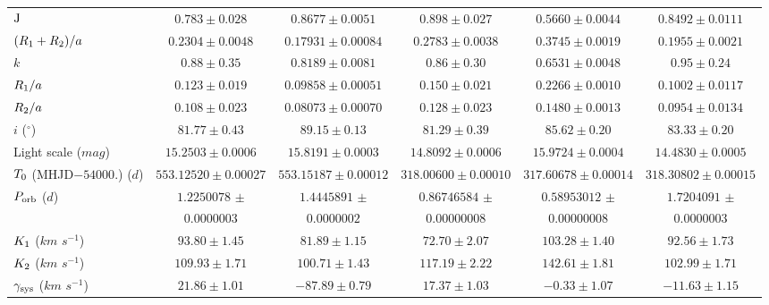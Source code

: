 \documentclass[fleqn,usenatbib]{mnras}
\begin{document}
\begin{table*}
\begin{center}
\begin{tabular}{lccccc}
${\rm J}$ & $0.783 \pm 0.028$ & $0.8677 \pm 0.0051$ & $0.898 \pm 0.027$ & $0.5660 \pm 0.0044$ & $0.8492 \pm 0.0111$ \\
$(R_{\rm 1}+R_{\rm 2})/{a}$ & $0.2304 \pm 0.0048$ & $0.17931 \pm 0.00084$ & $0.2783 \pm 0.0038$ & $0.3745 \pm 0.0019$ & $0.1955 \pm 0.0021$ \\
${k}$ & $0.88 \pm 0.35$ & $0.8189 \pm 0.0081$ & $0.86 \pm 0.30$ & $0.6531 \pm 0.0048$ & $0.95 \pm 0.24$ \\
$R_{\rm 1}/a$ & $0.123 \pm 0.019$ & $0.09858 \pm 0.00051$ & $0.150 \pm 0.021$ & $0.2266 \pm 0.0010$ & $0.1002 \pm 0.0117$ \\
$R_{\rm 2}/a$ & $0.108 \pm 0.023$ & $0.08073 \pm 0.00070$ & $0.128 \pm 0.023$ & $0.1480 \pm 0.0013$ & $0.0954 \pm 0.0134$ \\
${i}$ {($^\circ $)} & $81.77 \pm 0.43$ & $89.15 \pm 0.13$ & $81.29 \pm 0.39$ & $85.62 \pm 0.20$ & $83.33 \pm 0.20$ \\
{Light scale} {($mag$)} & $15.2503 \pm 0.0006$ & $15.8191 \pm 0.0003$ & $14.8092 \pm 0.0006$ & $15.9724 \pm 0.0004$ & $14.4830 \pm 0.0005$ \\
${T_{\rm 0}}$ {\scriptsize (MHJD$-54000.$)} {($d$)} & $553.12520 \pm 0.00027$ & $553.15187 \pm 0.00012$ & $318.00600 \pm 0.00010$ & $317.60678 \pm 0.00014$ & $318.30802 \pm 0.00015$ \\
${P_{\rm orb}}$ {($d$)} & $1.2250078$ $\pm$ & $1.4445891$ $\pm$ & $0.86746584$ $\pm$ & $0.58953012$ $\pm$ & $1.7204091$ $\pm$ \\
              & $0.0000003$ & $0.0000002$ & $0.00000008$ & $0.00000008$ & $0.0000003$ \\

${K_{\rm 1}}$ {($km$ $s^{-1}$)} & $93.80 \pm 1.45$ & $81.89 \pm 1.15$ & $72.70 \pm 2.07$ & $103.28 \pm 1.40$ & $92.56 \pm 1.73$ \\
${K_{\rm 2}}$ {($km$ $s^{-1}$)} & $109.93 \pm 1.71$ & $100.71 \pm 1.43$ & $117.19 \pm 2.22$ & $142.61 \pm 1.81$ & $102.99 \pm 1.71$ \\
${\gamma_{\rm sys}}$ {($km$ $s^{-1}$)} & $21.86 \pm 1.01$ & $-87.89 \pm 0.79$ & $17.37 \pm 1.03$ & $-0.33 \pm 1.07$ & $-11.63 \pm 1.15$ \\



\end{tabular}
\end{center}
\end{table*}
\end{document}
